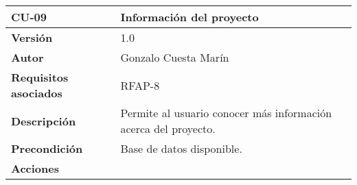 \begin{longtable}[]{@{}ll@{}}
\toprule
\begin{minipage}[b]{0.27\columnwidth}\raggedright
\textbf{CU-09}\strut
\end{minipage} & \begin{minipage}[b]{0.67\columnwidth}\raggedright
\textbf{Información del proyecto}\strut
\end{minipage}\tabularnewline
\midrule
\endhead
\begin{minipage}[t]{0.27\columnwidth}\raggedright
\textbf{Versión}\strut
\end{minipage} & \begin{minipage}[t]{0.67\columnwidth}\raggedright
1.0\strut
\end{minipage}\tabularnewline
\begin{minipage}[t]{0.27\columnwidth}\raggedright
\textbf{Autor}\strut
\end{minipage} & \begin{minipage}[t]{0.67\columnwidth}\raggedright
Gonzalo Cuesta Marín\strut
\end{minipage}\tabularnewline
\begin{minipage}[t]{0.27\columnwidth}\raggedright
\textbf{Requisitos asociados}\strut
\end{minipage} & \begin{minipage}[t]{0.67\columnwidth}\raggedright
RFAP-8\strut
\end{minipage}\tabularnewline
\begin{minipage}[t]{0.27\columnwidth}\raggedright
\textbf{Descripción}\strut
\end{minipage} & \begin{minipage}[t]{0.67\columnwidth}\raggedright
Permite al usuario conocer más información acerca del proyecto.\strut
\end{minipage}\tabularnewline
\begin{minipage}[t]{0.27\columnwidth}\raggedright
\textbf{Precondición}\strut
\end{minipage} & \begin{minipage}[t]{0.67\columnwidth}\raggedright
Base de datos disponible.\strut
\end{minipage}\tabularnewline
\begin{minipage}[t]{0.27\columnwidth}\raggedright
\textbf{Acciones}\strut
\end{minipage} & \begin{minipage}[t]{0.67\columnwidth}\raggedright
\begin{enumerate}

\end{enumerate}
\end{minipage}
\end{longtable}

